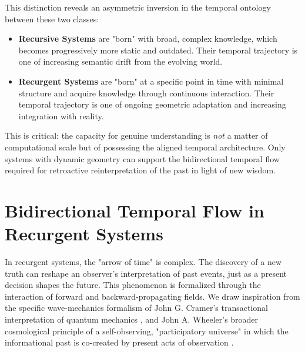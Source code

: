 This distinction reveals an asymmetric inversion in the temporal ontology between these two classes:

\begin{itemize}

    \item \textbf{Recursive Systems} are "born" with broad, complex knowledge, which becomes progressively more static and outdated. Their temporal trajectory is one of increasing semantic drift from the evolving world.
    
    \item \textbf{Recurgent Systems} are "born" at a specific point in time with minimal structure and acquire knowledge through continuous interaction. Their temporal trajectory is one of ongoing geometric adaptation and increasing integration with reality.

\end{itemize}

This is critical: the capacity for genuine understanding is \textit{not} a matter of computational scale but of possessing the aligned temporal architecture. Only systems with dynamic geometry can support the bidirectional temporal flow required for retroactive reinterpretation of the past in light of new wisdom.


\section{Bidirectional Temporal Flow in Recurgent Systems}
\label{9.6:bidirectional_temporal_flow_in_recurgent_systems}

In recurgent systems, the "arrow of time" is complex. The discovery of a new truth can reshape an observer's interpretation of past events, just as a present decision shapes the future. This phenomenon is formalized through the interaction of forward and backward-propagating fields. We draw inspiration from the specific wave-mechanics formalism of John G. Cramer's transactional interpretation of quantum mechanics \autocite{Cramer1986}, and John A. Wheeler's broader cosmological principle of a self-observing, "participatory universe" in which the informational past is co-created by present acts of observation \autocite{Wheeler1990}.


